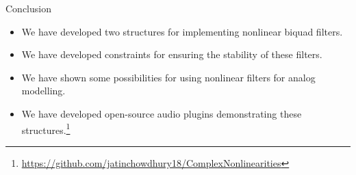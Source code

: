 \documentclass[14pt,aspectratio=169]{beamer}
\begin{document}
\begin{frame}{Conclusion}
    \begin{itemize}
        \setlength\itemsep{0.8em}
        \item We have developed two structures for implementing nonlinear biquad filters.
        \item We have developed constraints for ensuring the stability of these filters.
        \item We have shown some possibilities for using nonlinear filters for analog modelling.
        \item We have developed open-source audio plugins demonstrating these structures.\footnote{\url{https://github.com/jatinchowdhury18/ComplexNonlinearities}}
    \end{itemize}
\end{frame}

\begin{frame}{}
\end{frame}
\end{document}
